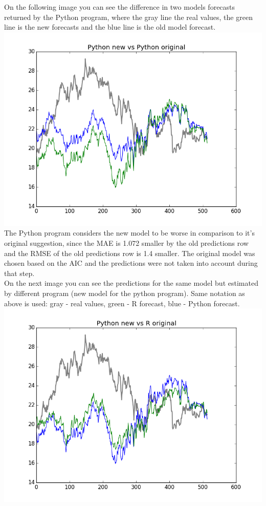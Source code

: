 \documentclass{article}
\begin{document}
On the following image you can see the difference in two models forecasts returned by the Python program, where the gray line the real values, the green line is the new forecasts and the blue line is the old model forecast.\\
\includegraphics[scale=0.75]{PythonOriginalVsPythonNew.png}\\
The Python program considers the new model to be worse in comparison to it's original suggestion, since the MAE is 1.072 smaller by the old predictions row and the RMSE of the old predictions row is 1.4 smaller. The original model was chosen based on the AIC and the predictions were not taken into account during that step.\\
On the next image you can see the predictions for the same model but estimated by different program (new model for the python program). Same notation as above is used: gray - real values, green - R forecast, blue - Python forecast.\\
\includegraphics[scale=0.75]{ROriginalVsPythonNew.png}
\end{document}
